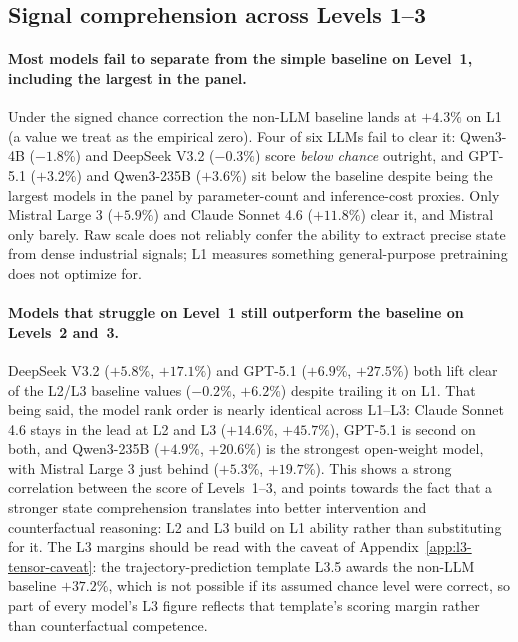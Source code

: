 \subsection{Signal comprehension across Levels 1--3}

\paragraph{Most models fail to separate from the simple baseline on Level~1, including the largest in the panel.}
Under the signed chance correction the non-LLM baseline lands at $+4.3\%$ on L1 (a value we treat as the empirical zero). Four of six LLMs fail to clear it: Qwen3-4B ($-1.8\%$) and DeepSeek V3.2 ($-0.3\%$) score \emph{below chance} outright, and GPT-5.1 ($+3.2\%$) and Qwen3-235B ($+3.6\%$) sit below the baseline despite being the largest models in the panel by parameter-count and inference-cost proxies. Only Mistral Large 3 ($+5.9\%$) and Claude Sonnet 4.6 ($+11.8\%$) clear it, and Mistral only barely. Raw scale does not reliably confer the ability to extract precise state from dense industrial signals; L1 measures something general-purpose pretraining does not optimize for.

\paragraph{Models that struggle on Level~1 still outperform the baseline on Levels~2 and~3.}
DeepSeek V3.2 ($+5.8\%$, $+17.1\%$) and GPT-5.1 ($+6.9\%$, $+27.5\%$) both lift clear of the L2/L3 baseline values ($-0.2\%$, $+6.2\%$) despite trailing it on L1. That being said, the model rank order is nearly identical across L1--L3: Claude Sonnet 4.6 stays in the lead at L2 and L3 ($+14.6\%$, $+45.7\%$), GPT-5.1 is second on both, and Qwen3-235B ($+4.9\%$, $+20.6\%$) is the strongest open-weight model, with Mistral Large 3 just behind ($+5.3\%$, $+19.7\%$). This shows a strong correlation between the score of Levels~1--3, and points towards the fact that a stronger state comprehension translates into better intervention and counterfactual reasoning: L2 and L3 build on L1 ability rather than substituting for it. The L3 margins should be read with the caveat of Appendix~\ref{app:l3-tensor-caveat}: the trajectory-prediction template L3.5 awards the non-LLM baseline $+37.2\%$, which is not possible if its assumed chance level were correct, so part of every model's L3 figure reflects that template's scoring margin rather than counterfactual competence.

